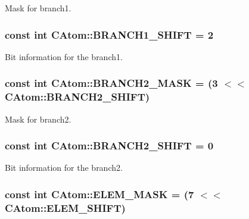 Mask for branch1. 

\hypertarget{classCAtom_a1681cf237fc69b41f3cd19883b0d95f9}{
\subsubsection[{B\-R\-A\-N\-C\-H1\-\_\-\-S\-H\-I\-F\-T}]{\setlength{\rightskip}{0pt plus 5cm}const int C\-Atom\-::\-B\-R\-A\-N\-C\-H1\-\_\-\-S\-H\-I\-F\-T = 2\hspace{0.3cm}{\ttfamily [static]}}}\label{classCAtom_a1681cf237fc69b41f3cd19883b0d95f9}


Bit information for the branch1. 

\hypertarget{classCAtom_a5c11499e3e68349fd7e83369a5939319}{
\subsubsection[{B\-R\-A\-N\-C\-H2\-\_\-\-M\-A\-S\-K}]{\setlength{\rightskip}{0pt plus 5cm}const int C\-Atom\-::\-B\-R\-A\-N\-C\-H2\-\_\-\-M\-A\-S\-K = (3 $<$$<$ {\bf C\-Atom\-::\-B\-R\-A\-N\-C\-H2\-\_\-\-S\-H\-I\-F\-T})\hspace{0.3cm}{\ttfamily [static]}}}\label{classCAtom_a5c11499e3e68349fd7e83369a5939319}


Mask for branch2. 

\hypertarget{classCAtom_a1932c279f682ca9a43d653ec5afae175}{
\subsubsection[{B\-R\-A\-N\-C\-H2\-\_\-\-S\-H\-I\-F\-T}]{\setlength{\rightskip}{0pt plus 5cm}const int C\-Atom\-::\-B\-R\-A\-N\-C\-H2\-\_\-\-S\-H\-I\-F\-T = 0\hspace{0.3cm}{\ttfamily [static]}}}\label{classCAtom_a1932c279f682ca9a43d653ec5afae175}


Bit information for the branch2. 

\hypertarget{classCAtom_aa97b0aef40ff8616ad51269c3bd50070}{
\subsubsection[{E\-L\-E\-M\-\_\-\-M\-A\-S\-K}]{\setlength{\rightskip}{0pt plus 5cm}const int C\-Atom\-::\-E\-L\-E\-M\-\_\-\-M\-A\-S\-K = (7 $<$$<$ {\bf C\-Atom\-::\-E\-L\-E\-M\-\_\-\-S\-H\-I\-F\-T})\hspace{0.3cm}{\ttfamily [static]}}}\label{classCAtom_aa97b0aef40ff8616ad51269c3bd50070}


